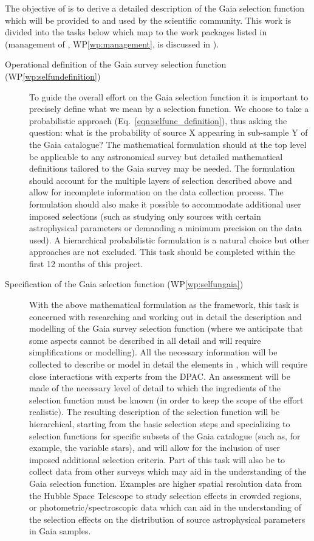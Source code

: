 The objective of {\acro} is to derive a detailed description of the Gaia selection function which will be provided to and used by the scientific community. This work is divided into the tasks below which map to the work packages listed in  (management of {\acro}, WP\ref{wp:management}, is discussed in ).

\begin{description}
    \item[Operational definition of the Gaia survey selection function (WP\ref{wp:selfundefinition})] To guide the overall effort on the Gaia selection function it is important to precisely define what we mean by a selection function. We choose to take a probabilistic approach (Eq.~\ref{eqn:selfunc_definition}), thus asking the question: what is the probability of source X appearing in sub-sample Y of the Gaia catalogue? The mathematical formulation should at the top level be applicable to any astronomical survey but detailed mathematical definitions tailored to the Gaia survey may be needed. The formulation should account for the multiple layers of selection described above and allow for incomplete information on the data collection process. The formulation should also make it possible to accommodate additional user imposed selections (such as studying only sources with certain astrophysical parameters or demanding a minimum precision on the data used). A hierarchical probabilistic formulation is a natural choice but other approaches are not excluded. This task should be completed within the first 12 months of this project.
    \item[Specification of the Gaia selection function (WP\ref{wp:selfungaia})] With the above mathematical formulation as the framework, this task is concerned with researching and working out in detail the description and modelling of the Gaia survey selection function (where we anticipate that some aspects cannot be described in all detail and will require simplifications or modelling). All the necessary information will be collected to describe or model in detail the elements in , which will require close interactions with experts from the DPAC. An assessment will be made of the necessary level of detail to which the ingredients of the selection function must be known (in order to keep the scope of the effort realistic). The resulting description of the selection function will be hierarchical, starting from the basic selection steps and specializing to selection functions for specific subsets of the Gaia catalogue (such as, for example, the variable stars), and will allow for the inclusion of user imposed additional selection criteria. Part of this task will also be to collect data from other surveys which may aid in the understanding of the Gaia selection function. Examples are higher spatial resolution data from the Hubble Space Telescope to study selection effects in crowded regions, or photometric/spectroscopic data which can aid in the understanding of the selection effects on the distribution of source astrophysical parameters in Gaia samples.

\end{description}
